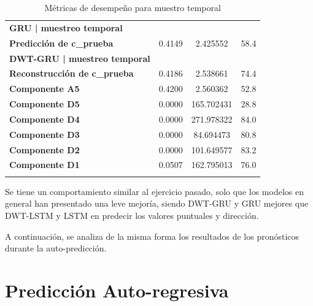 \begin{longtable}{lccc}
\textbf{GRU | muestreo temporal} &  &  &  \\
\textbf{Predicción de c\_prueba} & 0.4149 & 2.425552 & 58.4 \\
\textbf{DWT-GRU | muestreo temporal} &  &  &  \\
\textbf{Reconstrucción de c\_prueba} & 0.4186 & 2.538661 & 74.4 \\
\textbf{Componente A5} & 0.4200 & 2.560362 & 52.8 \\
\textbf{Componente D5} & 0.0000 & 165.702431 & 28.8 \\
\textbf{Componente D4} & 0.0000 & 271.978322 & 84.0 \\
\textbf{Componente D3} & 0.0000 & 84.694473 & 80.8 \\
\textbf{Componente D2} & 0.0000 & 101.649577 & 83.2 \\
\textbf{Componente D1} & 0.0507 & 162.795013 & 76.0 \\
\caption{Métricas de desempeño para muestro temporal}
\label{tab:resultados_prediccion_estandar_m_temporal}
\end{longtable}

Se tiene un comportamiento similar al ejercicio pasado, solo que los modelos en general han presentado una leve mejoría, siendo DWT-GRU y GRU mejores que DWT-LSTM y LSTM en predecir los valores puntuales y dirección.

A continuación, se analiza de la misma forma los resultados de los pronósticos durante la auto-predicción.

\section{Predicción Auto-regresiva}

  
